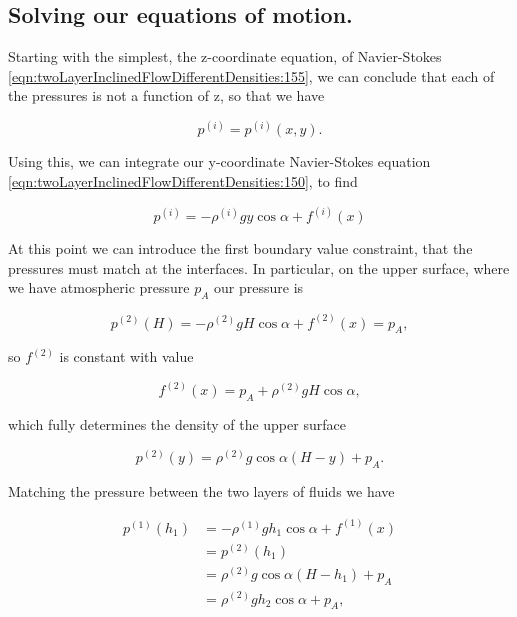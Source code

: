 \subsection{Solving our equations of motion.}

Starting with the simplest, the z-coordinate equation, of Navier-Stokes \ref{eqn:twoLayerInclinedFlowDifferentDensities:155}, we can conclude that each of the pressures is not a function of z, so that we have

\begin{equation}\label{eqn:twoLayerInclinedFlowDifferentDensities:235}
p^{(i)} = p^{(i)}(x, y).
\end{equation}

Using this, we can integrate our y-coordinate Navier-Stokes equation \ref{eqn:twoLayerInclinedFlowDifferentDensities:150}, to find

\begin{equation}\label{eqn:twoLayerInclinedFlowDifferentDensities:255}
p^{(i)} = - \rho^{(i)} g y \cos\alpha + f^{(i)}(x)
\end{equation}

At this point we can introduce the first boundary value constraint, that the pressures must match at the interfaces.  In particular, on the upper surface, where we have atmospheric pressure $p_A$ our pressure is

\begin{equation}\label{eqn:twoLayerInclinedFlowDifferentDensities:275}
p^{(2)}(H) = - \rho^{(2)} g H \cos\alpha + f^{(2)}(x) = p_A,
\end{equation}

so $f^{(2)}$ is constant with value

\begin{equation}\label{eqn:twoLayerInclinedFlowDifferentDensities:295}
f^{(2)}(x) = p_A + \rho^{(2)} g H \cos\alpha,
\end{equation}

which fully determines the density of the upper surface

\begin{equation}\label{eqn:twoLayerInclinedFlowDifferentDensities:315}
p^{(2)}(y) = \rho^{(2)} g \cos\alpha (H - y) + p_A.
\end{equation}

Matching the pressure between the two layers of fluids we have

\begin{align*}
p^{(1)}(h_1) &= - \rho^{(1)} g h_1 \cos\alpha + f^{(1)}(x) \\
             &= p^{(2)}(h_1) \\
             &= \rho^{(2)} g \cos\alpha (H - h_1) + p_A \\
             &= \rho^{(2)} g h_2 \cos\alpha + p_A,
\end{align*}

